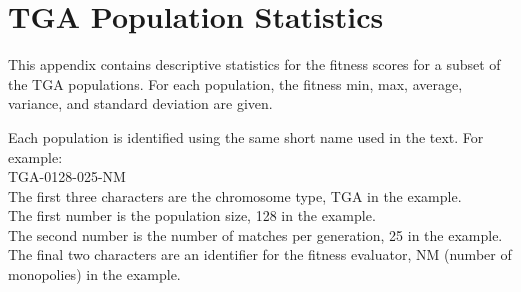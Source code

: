 \clearpage
\chapter{TGA Population Statistics}
\label{appendix:tgastats}

This appendix contains descriptive statistics for the fitness scores for a
subset of the TGA populations. For each population, the fitness min,
max, average, variance, and standard deviation are given.

Each population is identified using the same short name used in the text. For
example: \\ 

TGA-0128-025-NM \\ 

The first three characters are the chromosome type, TGA in the example. \\

The first number is the population size, 128 in the example. \\

The second number is the number of matches per generation, 25 in the example. \\

The final two characters are an identifier for the fitness evaluator, NM
(number of monopolies) in the example.

\newpage




